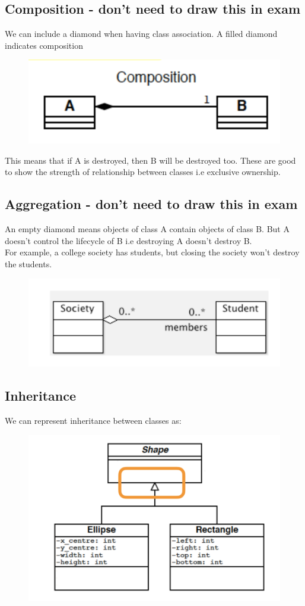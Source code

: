 \documentclass{article}
\begin{document}
\subsection{Composition - don't need to draw this in exam}
We can include a diamond when having class association. A filled diamond indicates composition
\begin{figure}[H]
\centering
\includegraphics[width = 0.3\linewidth]{Pictures/Screenshot 2023-01-27 at 12.27.25.png}
\end{figure}
This means that if A is destroyed, then B will be destroyed too. These are good to show the strength of relationship between classes i.e exclusive ownership.
\subsection{Aggregation - don't need to draw this in exam}
An empty diamond means objects of class A contain objects of class B. But A doesn't control the lifecycle of B i.e destroying A doesn't destroy B. \\
For example, a college society has students, but closing the society won't destroy the students.
\begin{figure}[H]
\centering
\includegraphics[width = 0.6\linewidth]{Pictures/Screenshot 2023-01-27 at 12.30.49.png}
\end{figure}
\subsection{Inheritance}
We can represent inheritance between classes as:
\begin{figure}[H]
\centering
\includegraphics[width = 0.5\linewidth]{Pictures/Screenshot 2023-01-27 at 12.32.13.png}
\end{figure}
\end{document}
